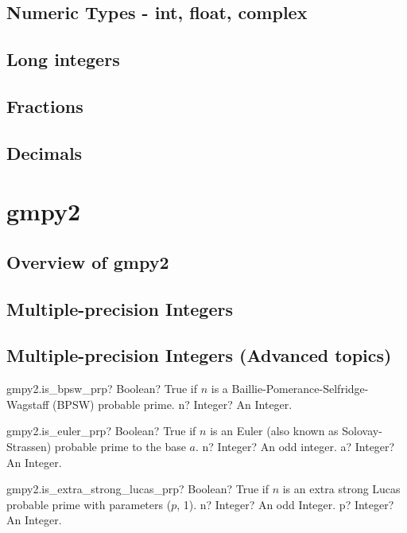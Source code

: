 \documentclass[12pt,a4paper,openany]{book}
\begin{document}
\section{Numeric Types - int, float, complex}

\section{Long integers}

\section{Fractions}

\section{Decimals}

\chapter{gmpy2}

\section{Overview of gmpy2}

\section{Multiple-precision Integers}

\section{Multiple-precision Integers (Advanced topics)}

\begin{mpFunctionsExtract}
\mpFunctionOne
{gmpy2.is\_bpsw\_prp? Boolean? True if $n$ is a Baillie-Pomerance-Selfridge-Wagstaff (BPSW) probable prime.}
{n? Integer? An Integer.}
\end{mpFunctionsExtract}

\begin{mpFunctionsExtract}
\mpFunctionTwo
{gmpy2.is\_euler\_prp? Boolean? True if $n$ is an Euler (also known as Solovay-Strassen) probable prime to the base $a$.}
{n? Integer? An odd integer.}
{a? Integer? An Integer.}
\end{mpFunctionsExtract}

\begin{mpFunctionsExtract}
\mpFunctionTwo
{gmpy2.is\_extra\_strong\_lucas\_prp? Boolean? True if $n$ is an extra strong Lucas probable prime with parameters ($p$, 1).}
{n? Integer? An odd Integer.}
{p? Integer? An Integer.}
\end{mpFunctionsExtract}
\end{document}
